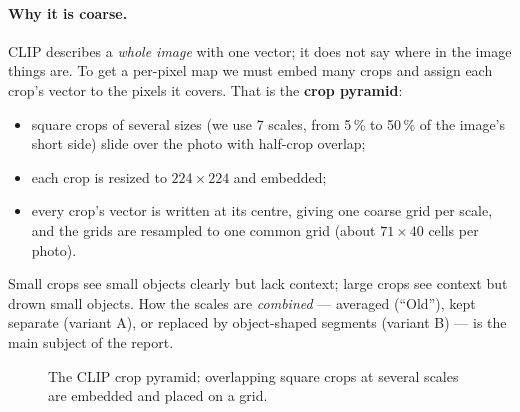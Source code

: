 \documentclass[11pt,a4paper]{article}
\begin{document}
\paragraph{Why it is coarse.} CLIP describes a \emph{whole image} with one vector; it does not say where in the image
things are. To get a per-pixel map we must embed many crops and assign each crop's vector to the pixels it covers.
That is the \textbf{crop pyramid}:
\begin{itemize}
  \item square crops of several sizes (we use 7 scales, from 5\,\% to 50\,\% of the image's short side) slide over the
        photo with half-crop overlap;
  \item each crop is resized to $224\times224$ and embedded;
  \item every crop's vector is written at its centre, giving one coarse grid per scale, and the grids are resampled to
        one common grid (about $71\times40$ cells per photo).
\end{itemize}
Small crops see small objects clearly but lack context; large crops see context but drown small objects. How the
scales are \emph{combined} --- averaged (``Old''), kept separate (variant A), or replaced by object-shaped segments
(variant B) --- is the main subject of the report.

\begin{figure}[ht]
\centering
{}
\caption{The CLIP crop pyramid: overlapping square crops at several scales are embedded and placed on a grid.}
\end{figure}
\end{document}

